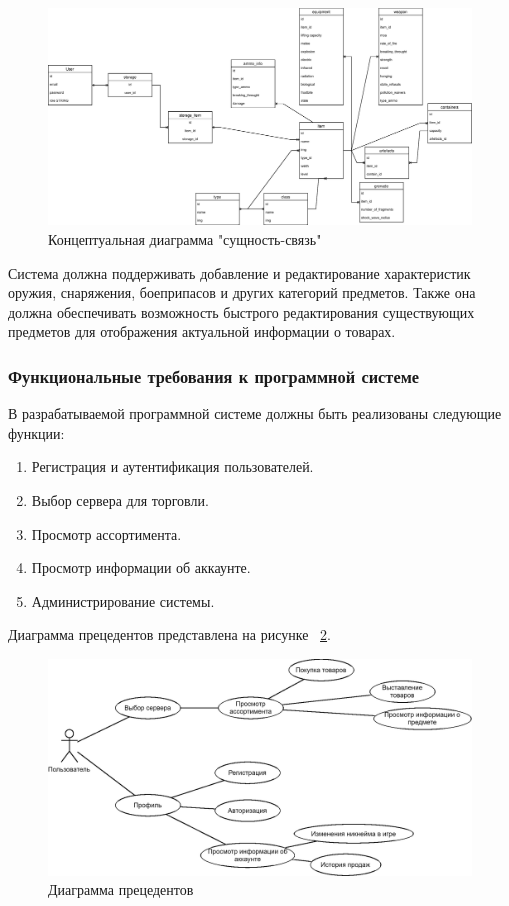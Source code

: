\begin{figure}[h]
	\includegraphics[width=1\linewidth]{images/modelbd}
	\caption{Концептуальная диаграмма "сущность-связь"}
	\label{fig:modelbd}
\end{figure}

Система должна поддерживать добавление и редактирование характеристик оружия, снаряжения, боеприпасов и других категорий предметов. Также она должна обеспечивать возможность быстрого редактирования существующих предметов для отображения актуальной информации о товарах.

\subsubsection{Функциональные требования к программной системе}

В разрабатываемой программной системе должны быть реализованы следующие функции:

\begin{enumerate}
	\item Регистрация и аутентификация пользователей.
	\item Выбор сервера для торговли.
	\item Просмотр ассортимента.
	\item Просмотр информации об аккаунте.
	\item Администрирование системы.
\end{enumerate}

Диаграмма прецедентов представлена на рисунке ~\ref{fig:precendent}.

\begin{figure}[h]
	\includegraphics[width=1\linewidth]{images/precendent}
	\caption{Диаграмма прецедентов}
	\label{fig:precendent}
\end{figure}


